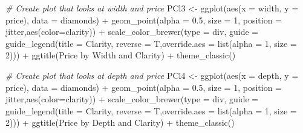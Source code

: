 \documentclass[
]{article}
\newenvironment{Shaded}{\begin{snugshade}}{\end{snugshade}}
\newcommand{\AttributeTok}[1]{\textcolor[rgb]{0.77,0.63,0.00}{#1}}
\newcommand{\CommentTok}[1]{\textcolor[rgb]{0.56,0.35,0.01}{\textit{#1}}}
\newcommand{\DecValTok}[1]{\textcolor[rgb]{0.00,0.00,0.81}{#1}}
\newcommand{\FloatTok}[1]{\textcolor[rgb]{0.00,0.00,0.81}{#1}}
\newcommand{\FunctionTok}[1]{\textcolor[rgb]{0.00,0.00,0.00}{#1}}
\newcommand{\NormalTok}[1]{#1}
\newcommand{\OtherTok}[1]{\textcolor[rgb]{0.56,0.35,0.01}{#1}}
\newcommand{\SpecialCharTok}[1]{\textcolor[rgb]{0.00,0.00,0.00}{#1}}
\newcommand{\StringTok}[1]{\textcolor[rgb]{0.31,0.60,0.02}{#1}}
\begin{document}
\begin{Shaded}
\begin{Highlighting}[]
\CommentTok{\# Create plot that looks at width and price}
\NormalTok{PCl3 }\OtherTok{\textless{}{-}} \FunctionTok{ggplot}\NormalTok{(}\FunctionTok{aes}\NormalTok{(}\AttributeTok{x =}\NormalTok{ width, }\AttributeTok{y =}\NormalTok{ price), }\AttributeTok{data =}\NormalTok{ diamonds) }\SpecialCharTok{+} \FunctionTok{geom\_point}\NormalTok{(}\AttributeTok{alpha =} \FloatTok{0.5}\NormalTok{, }\AttributeTok{size =} \DecValTok{1}\NormalTok{, }\AttributeTok{position =} \StringTok{\textquotesingle{}jitter\textquotesingle{}}\NormalTok{,}\FunctionTok{aes}\NormalTok{(}\AttributeTok{color=}\NormalTok{clarity)) }\SpecialCharTok{+}
  \FunctionTok{scale\_color\_brewer}\NormalTok{(}\AttributeTok{type =} \StringTok{\textquotesingle{}div\textquotesingle{}}\NormalTok{, }\AttributeTok{guide =} \FunctionTok{guide\_legend}\NormalTok{(}\AttributeTok{title =} \StringTok{\textquotesingle{}Clarity\textquotesingle{}}\NormalTok{, }\AttributeTok{reverse =}\NormalTok{ T,}\AttributeTok{override.aes =} \FunctionTok{list}\NormalTok{(}\AttributeTok{alpha =} \DecValTok{1}\NormalTok{, }\AttributeTok{size =} \DecValTok{2}\NormalTok{)))       }\SpecialCharTok{+} \FunctionTok{ggtitle}\NormalTok{(}\StringTok{\textquotesingle{}Price by Width and Clarity\textquotesingle{}}\NormalTok{) }\SpecialCharTok{+} \FunctionTok{theme\_classic}\NormalTok{()}

\CommentTok{\# Create plot that looks at depth and price}
\NormalTok{PCl4 }\OtherTok{\textless{}{-}} \FunctionTok{ggplot}\NormalTok{(}\FunctionTok{aes}\NormalTok{(}\AttributeTok{x =}\NormalTok{ depth, }\AttributeTok{y =}\NormalTok{ price), }\AttributeTok{data =}\NormalTok{ diamonds) }\SpecialCharTok{+} \FunctionTok{geom\_point}\NormalTok{(}\AttributeTok{alpha =} \FloatTok{0.5}\NormalTok{, }\AttributeTok{size =} \DecValTok{1}\NormalTok{, }\AttributeTok{position =} \StringTok{\textquotesingle{}jitter\textquotesingle{}}\NormalTok{,}\FunctionTok{aes}\NormalTok{(}\AttributeTok{color=}\NormalTok{clarity)) }\SpecialCharTok{+}
  \FunctionTok{scale\_color\_brewer}\NormalTok{(}\AttributeTok{type =} \StringTok{\textquotesingle{}div\textquotesingle{}}\NormalTok{, }\AttributeTok{guide =} \FunctionTok{guide\_legend}\NormalTok{(}\AttributeTok{title =} \StringTok{\textquotesingle{}Clarity\textquotesingle{}}\NormalTok{, }\AttributeTok{reverse =}\NormalTok{ T,}\AttributeTok{override.aes =} \FunctionTok{list}\NormalTok{(}\AttributeTok{alpha =} \DecValTok{1}\NormalTok{, }\AttributeTok{size =} \DecValTok{2}\NormalTok{)))       }\SpecialCharTok{+} \FunctionTok{ggtitle}\NormalTok{(}\StringTok{\textquotesingle{}Price by Depth and Clarity\textquotesingle{}}\NormalTok{) }\SpecialCharTok{+} \FunctionTok{theme\_classic}\NormalTok{()}


\end{Highlighting}
\end{Shaded}
\end{document}
